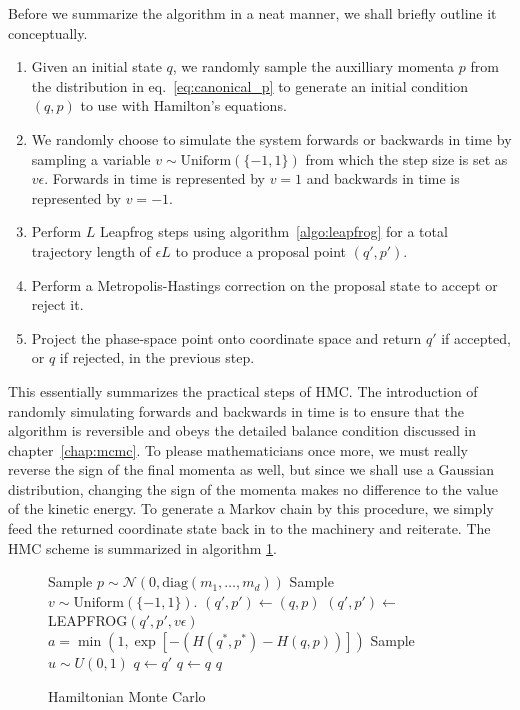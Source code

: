 Before we summarize the algorithm in a neat manner, we shall briefly outline it conceptually. 
\begin{enumerate}
  \item Given an initial state $q$, we randomly sample the auxilliary momenta $p$ from the distribution in eq.~\eqref{eq:canonical_p}
  to generate an initial condition $(q, p)$ to use with Hamilton's equations.
  \item We randomly choose to simulate the system forwards or backwards in time by sampling a variable $v \sim \text{Uniform}(\{-1, 1\})$
  from which the step size is set as $v\epsilon$. Forwards in time is represented by $v = 1$ and backwards in time is represented by $v = -1$. 
  \item Perform $L$ Leapfrog steps using algorithm~\ref{algo:leapfrog} for a total trajectory length of $\epsilon L$ to produce
  a proposal point $(q', p')$.
  \item Perform a Metropolis-Hastings correction on the proposal state to accept or reject it.
  \item Project the phase-space point onto coordinate space and return $q'$ if accepted, or $q$ if rejected, in the previous step.
\end{enumerate}
This essentially summarizes the practical steps of HMC. The introduction of randomly simulating
forwards and backwards in time is to ensure that the algorithm is reversible and obeys the detailed balance condition discussed in chapter~\ref{chap:mcmc}.
To please mathematicians once more, we must really reverse the sign of the final momenta as well, but since we shall use a Gaussian distribution, changing the sign
of the momenta makes no difference to the value of the kinetic energy. 
To generate a Markov chain by this procedure, we simply feed the returned coordinate state back in to the machinery 
and reiterate.
The HMC scheme is summarized in algorithm \ref{algo:hmc}.
\begin{figure}[H]
	\begin{algorithm}[H]
		\caption{Hamiltonian Monte Carlo}\label{algo:hmc}
		\begin{algorithmic}
      \State Sample $p \sim \mathcal{N}(0, \text{diag}(m_1, \ldots, m_d))$ 
      \State Sample $v \sim \text{Uniform}(\{-1, 1\})$. 
      \State $(q', p') \leftarrow (q, p)$    
       
        \State $(q', p') \leftarrow$ LEAPFROG$(q', p', v\epsilon)$ 
      \EndFor
      \State $a = \min \left(1, \exp\left[-\left(H(q^*,p^*) - H(q, p)\right)\right]\right)$ 
      \State Sample $u \sim U(0,1)$ 
       
        \State $q \gets q'$ 
      \Else
        \State $q \gets q$ 
      \EndIf
      \State \Return $q$
      \EndFunction
		\end{algorithmic}
	\end{algorithm}
\end{figure}

